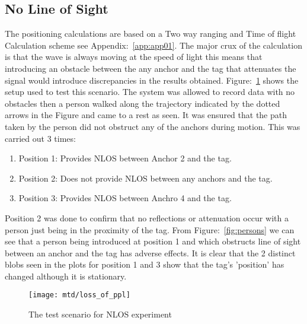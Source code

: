 \subsection*{No Line of Sight}
The positioning calculations are based on a Two way ranging and Time of flight Calculation scheme see Appendix:~\ref{app:app01}.
The major crux of the calculation is that the wave is always moving at the speed of light this means that introducing an obstacle between the any anchor and the tag that attenuates the signal would introduce discrepancies in the results obtained.
Figure:~\ref{fig:nlos} shows the setup used to test this scenario.
The system was allowed to record data with no obstacles then a person walked along the trajectory indicated by the dotted arrows in the Figure and came to a rest as seen.
It was ensured that the path taken by the person did not obstruct any of the anchors during motion.
This was carried out 3 times:
\begin{enumerate}
    \item Position 1: Provides NLOS between Anchor 2 and the tag.
    \item Position 2: Does not provide NLOS between any anchors and the tag.
    \item Position 3: Provides NLOS between Anchro 4 and the tag.
\end{enumerate}
Position 2 was done to confirm that no reflections or attenuation occur with a person just being in the proximity of the tag.
From Figure:~\ref{fig:persons} we can see that a person being introduced at position 1 and which obstructs line of sight between an anchor and the tag has adverse effects.
It is clear that the 2 distinct blobs seen in the plots for position 1 and 3 show that the tag's 'position' has changed although it is stationary.

\begin{figure}[h!]
    \centering
    \texttt{[image: mtd/loss\_of\_ppl]}
    \caption{The test scenario for NLOS experiment}
    \label{fig:nlos}
\end{figure}

